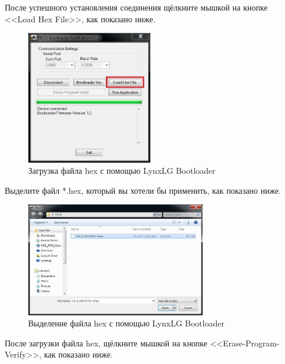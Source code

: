 После успешного установления соединения щёлкните мышкой на кнопке <<Load Hex
File>>, как показано ниже.

\begin{figure}[H]
  \centering
  \includegraphics[width=0.49\textwidth]{figures/loading_the_hex_file_with_lynxlg_bootloader}
  \caption{Загрузка файла hex с помощью LynxLG Bootloader}
  \label{fig:loading_the_hex_file_with_lynxlg_bootloader}
\end{figure}

Выделите файл *.hex, который вы хотели бы применить, как показано ниже.

\begin{figure}[H]
  \centering
  \includegraphics[width=0.7\textwidth]{figures/selecting_the_hex_file_with_the_lynxlg_bootloader}
  \caption{Выделение файла hex с помощью LynxLG Bootloader}
  \label{fig:selecting_the_hex_file_with_the_lynxlg_bootloader}
\end{figure}

После загрузки файла hex, щёлкните мышкой на кнопке <<Erase-Program-Verify>>,
как показано ниже.

